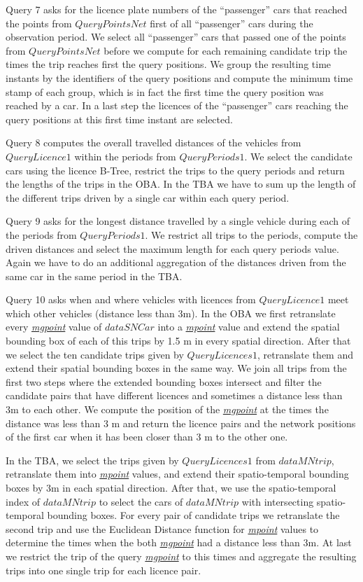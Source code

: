 \documentclass[a4paper]{article}
\newcommand{\dt}[1]{\textsl{\underline{#1}}}
\begin{document}
Query 7 asks for the licence plate numbers of the ``passenger'' cars that reached
the points from $QueryPointsNet$ first of all ``passenger'' cars during the
observation period. We select all ``passenger'' cars that passed one
of the points from $QueryPointsNet$ before we compute for each remaining candidate
trip the times the trip reaches first the query positions.
We group the resulting time instants
by the identifiers of the query positions and compute the minimum time stamp of
each group, which is in fact the first time the query position was reached by a
car. In a last step the licences of the ``passenger'' cars reaching the query
positions at this first time instant are selected.

Query 8 computes the overall travelled distances of the vehicles from $QueryLicence1$
within the periods from $QueryPeriods1$. We select the candidate cars using the
licence B-Tree, restrict the trips to the query periods and return the lengths of the
trips in the OBA. In the TBA we have to sum up the length of the different
trips driven by a single car within each query period.

Query 9 asks for the longest distance travelled by a single vehicle during each
of the periods from $QueryPeriods1$. We restrict all trips to the periods, compute
the driven distances and select the maximum length for each query periods value.
Again we have to do an additional aggregation of the distances driven from the same
car in the same period in the TBA.

Query 10 asks when and where vehicles with licences from $QueryLicence1$ meet which
other vehicles (distance less than 3m). In the OBA we first retranslate every
\dt{mgpoint} value of $dataSNCar$ into a \dt{mpoint} value and extend the spatial
bounding box of each of this trips by 1.5 m in every spatial direction. After that we
select the ten candidate trips given by $QueryLicences1$, retranslate them and
extend their spatial bounding boxes in the same way. We join all trips from the
first two steps where the extended bounding boxes intersect and filter the
candidate pairs that have different licences and sometimes a distance less than
3m to each other. We compute the position of the \dt{mgpoint} at the
times the distance was less than 3 m and return the licence pairs and the network positions of the first car when it has been closer than 3 m to the other one.

In the TBA, we select the trips given by $QueryLicences1$ from
$dataMNtrip$, retranslate them into \dt{mpoint} values, and extend their spatio-temporal
bounding boxes by 3m in each spatial direction. After that, we use the spatio-temporal
index of $dataMNtrip$ to select the cars of $dataMNtrip$ with intersecting
spatio-temporal bounding boxes. For every pair of candidate trips we
retranslate the second trip and use the Euclidean Distance function for \dt{mpoint}
values to determine the times when the both \dt{mgpoint} had a distance less than 3m.
At last we restrict the trip of the query \dt{mgpoint} to this times and
aggregate the resulting trips into one single trip for each licence pair.
\end{document}
